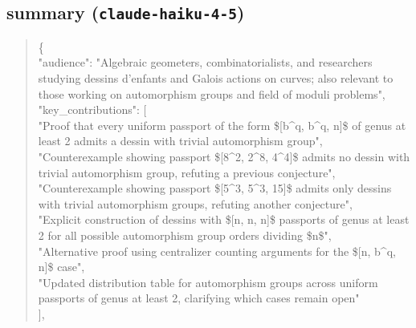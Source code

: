 \documentclass[11pt]{article}
\begin{document}
\subsection*{summary (\texttt{claude-haiku-4-5})}
\begin{quote}\small\ttfamily\raggedright
\{\\
  "audience": "Algebraic geometers, combinatorialists, and researchers studying dessins d'enfants and Galois actions on curves; also relevant to those working on automorphism groups and field of moduli problems",\\
  "key\_contributions": [\\
    "Proof that every uniform passport of the form \$[b\^{}q, b\^{}q, n]\$ of genus at least 2 admits a dessin with trivial automorphism group",\\
    "Counterexample showing passport \$[8\^{}2, 2\^{}8, 4\^{}4]\$ admits no dessin with trivial automorphism group, refuting a previous conjecture",\\
    "Counterexample showing passport \$[5\^{}3, 5\^{}3, 15]\$ admits only dessins with trivial automorphism groups, refuting another conjecture",\\
    "Explicit construction of dessins with \$[n, n, n]\$ passports of genus at least 2 for all possible automorphism group orders dividing \$n\$",\\
    "Alternative proof using centralizer counting arguments for the \$[n, b\^{}q, n]\$ case",\\
    "Updated distribution table for automorphism groups across uniform passports of genus at least 2, clarifying which cases remain open"\\
  ],\\

\end{quote}
\end{document}
